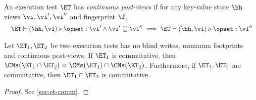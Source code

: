 \begin{definition}
An execution test $\ET$ has \emph{continuous post-views} if for any key-value store \( \hh \)
views \( \vi, \vi',\vi''\) and fingerprint \( \f \), 
\[
\begin{array}{@{}l@{}}
    \quad \ET \vdash (\hh, \vi) \triangleright \opset : \vi' \land \vi' \sqsubseteq \vi'' \implies \ET \vdash (\hh, \vi) \triangleright \opset : \vi''
\end{array}
\]
\end{definition}

\begin{theorem}                                                                            
Let $\ET_1, \ET_2$ be two execution tests has no blind writes, minimum footprints and continuous post-views.
If $\ET_1$ is commutative, 
then $\CMs(\ET_1 \cap \ET_2) = \CMs(\ET_1) \cap \CMs(\ET_2)$. 
Furthermore, if $\ET_1, \ET_2$ are commutative, then $\ET_1 \cap \ET_2$ 
is commutative.
\end{theorem}
\begin{proof}
    See \cref{sec:et-comm}.
\end{proof}


%
%
